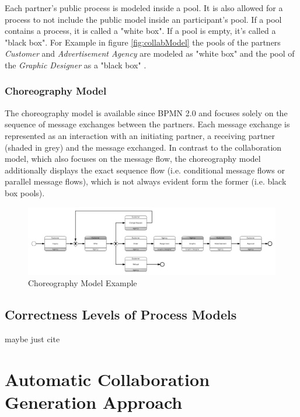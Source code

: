 \documentclass[runningheads]{llncs}
\begin{document}
Each partner's public process is modeled inside a pool. It is also allowed for a process to not include the public model inside an participant's pool. If a pool contains a process, it is called a "white box". If a pool is empty, it's called a "black box". For Example in figure \ref{fig:collabModel} the pools of the partners \textit{Customer} and \textit{Advertisement Agency} are modeled as "white box" and the pool of the \textit{Graphic Designer} as a "black box" \cite{BPMN20}.

\subsubsection{Choreography Model}
The choreography model is available since BPMN 2.0 and focuses solely on the sequence of message exchanges between the partners. Each message exchange is represented as an interaction with an initiating 
partner, a receiving partner (shaded in grey) and the message exchanged. In contrast to the collaboration model, which also focuses on the message flow, the choreography model additionally displays the exact sequence flow (i.e. conditional message flows or parallel message flows), which is not always evident form the former (i.e. black box pools).

\begin{figure}
\centering
\includegraphics[width=\textwidth]{images/choreo_advertisement.png}
\caption{Choreography Model Example}
\label{fig:choreoModel}
\end{figure}

\subsection{Correctness Levels of Process Models}
maybe just cite \cite{sabrina848}

\section{Automatic Collaboration Generation Approach}
\end{document}
